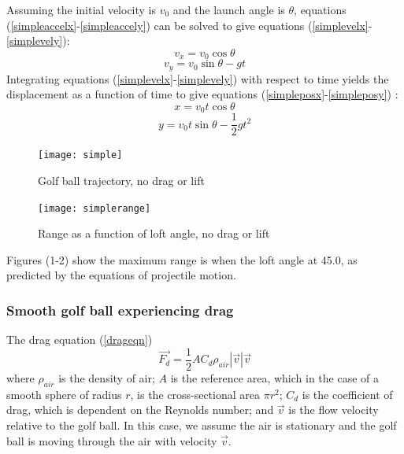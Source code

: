 \documentclass[12pt]{article}
\begin{document}
Assuming the initial velocity is $v_0$ and the launch angle is $\theta$, equations (\ref{simpleaccelx}-\ref{simpleaccely}) can be solved to give equations (\ref{simplevelx}-\ref{simplevely}):
\begin{equation} \label{simplevelx}
v_x=v_0 \cos{\theta}
\end{equation}
\begin{equation} \label{simplevely}
v_y=v_0 \sin{\theta}-gt
\end{equation}
Integrating equations (\ref{simplevelx}-\ref{simplevely}) with respect to time yields the displacement as a function of time to give equations (\ref{simpleposx}-\ref{simpleposy}) \cite{Penner2001}:
\begin{equation} \label{simpleposx}
x=v_0 t \cos{\theta}
\end{equation}
\begin{equation} \label{simpleposy}
y=v_0 t \sin{\theta}-\frac{1}{2} g t^2
\end{equation}

\begin{figure}[H]
\centering
\caption{Golf ball trajectory, no drag or lift}
\texttt{[image: simple]}
\end{figure}

\begin{figure}[H]
\centering
\caption{Range as a function of loft angle, no drag or lift}
\texttt{[image: simplerange]}
\end{figure}

Figures (1-2) show the maximum range is when the loft angle at 45.0\degree, as predicted by the equations of projectile motion.
\subsubsection{Smooth golf ball experiencing drag}
The drag equation (\ref{drageqn})
\begin{equation} \label{drageqn}
\vec{F_{d}} = \frac{1}{2} A C_{d} \rho_{air} |\vec{v}| \vec{v}
\end{equation}
where $\rho_{air}$ is the density of air; $A$ is the reference area, which in the case of a smooth sphere of radius $r$, is the cross-sectional area $\pi r^2$; $C_d$ is the coefficient of drag, which is dependent on the Reynolds number; and $\vec{v}$ is the flow velocity relative to the golf ball. In this case, we assume the air is stationary and the golf ball is moving through the air with velocity $\vec{v}$.
\end{document}

